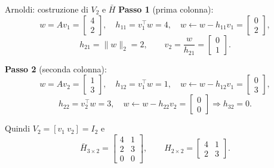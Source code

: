 \documentclass{beamer}
\begin{document}
\begin{frame}{Arnoldi: costruzione di $V_2$ e $\bar H$}
\textbf{Passo 1} (prima colonna):
\[
w=Av_1=\begin{bmatrix}4\\[2pt]2\end{bmatrix},\quad
h_{11}=v_1^\top w=4,\quad
w\leftarrow w-h_{11}v_1=\begin{bmatrix}0\\[2pt]2\end{bmatrix},
\]
\[
h_{21}=\|w\|_2=2,\qquad
v_2=\frac{w}{h_{21}}=\begin{bmatrix}0\\[2pt]1\end{bmatrix}.
\]

\textbf{Passo 2} (seconda colonna):
\[
w=Av_2=\begin{bmatrix}1\\[2pt]3\end{bmatrix},\quad
h_{12}=v_1^\top w=1,\quad
w\leftarrow w-h_{12}v_1=\begin{bmatrix}0\\[2pt]3\end{bmatrix},
\]
\[
h_{22}=v_2^\top w=3,\quad
w\leftarrow w-h_{22}v_2=\begin{bmatrix}0\\[2pt]0\end{bmatrix}\Rightarrow h_{32}=0.
\]

Quindi $V_2=[v_1\ v_2]=I_2$ e
\[
\bar H_{3\times 2}=
\begin{bmatrix}
4 & 1\\
2 & 3\\
0 & 0
\end{bmatrix},\qquad
H_{2\times 2}=
\begin{bmatrix}
4 & 1\\
2 & 3
\end{bmatrix}.
\]
\end{frame}
\end{document}
